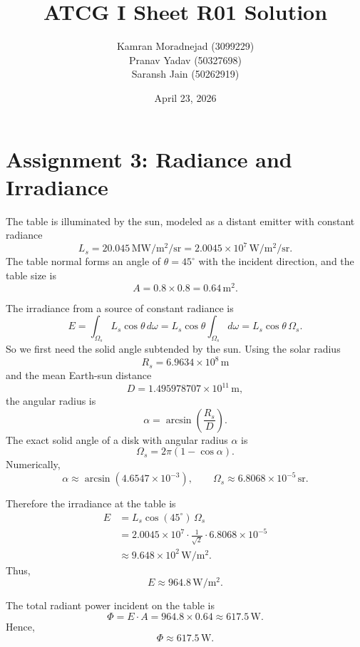 \documentclass[a4paper,11pt]{article}
\title{ATCG I Sheet R01 Solution}
\author{
\large Kamran Moradnejad (3099229) \\
\large Pranav Yadav (50327698) \\
\large Saransh Jain (50262919)
}
\date{April 23, 2026}
\begin{document}
\maketitle

\section*{Assignment 3: Radiance and Irradiance}
The table is illuminated by the sun, modeled as a distant emitter with constant radiance
\[
L_s = 20.045\,\si{\mega\watt\per\square\meter\per\steradian}
= 2.0045 \times 10^7\,\si{\watt\per\square\meter\per\steradian}.
\]
The table normal forms an angle of $\theta = 45^\circ$ with the incident direction, and the table size is
\[
A = 0.8 \times 0.8 = 0.64\,\si{\square\meter}.
\]

The irradiance from a source of constant radiance is
\[
E = \int_{\Omega_s} L_s \cos\theta \, d\omega
= L_s \cos\theta \int_{\Omega_s} d\omega
= L_s \cos\theta \, \Omega_s.
\]
So we first need the solid angle subtended by the sun. Using the solar radius
\[
R_s = 6.9634 \times 10^8\,\si{\meter}
\]
and the mean Earth-sun distance
\[
D = 1.495978707 \times 10^{11}\,\si{\meter},
\]
the angular radius is
\[
\alpha = \arcsin\left(\frac{R_s}{D}\right).
\]
The exact solid angle of a disk with angular radius $\alpha$ is
\[
\Omega_s = 2\pi(1-\cos\alpha).
\]
Numerically,
\[
\alpha \approx \arcsin(4.6547 \times 10^{-3}),
\qquad
\Omega_s \approx 6.8068 \times 10^{-5}\,\si{\steradian}.
\]

Therefore the irradiance at the table is
\begin{align*}
E
&= L_s \cos(45^\circ)\,\Omega_s \\
&= 2.0045 \times 10^7 \cdot \frac{1}{\sqrt{2}} \cdot 6.8068 \times 10^{-5} \\
&\approx 9.648 \times 10^2\,\si{\watt\per\square\meter}.
\end{align*}
Thus,
\[
\boxed{E \approx 964.8\,\si{\watt\per\square\meter}}.
\]

The total radiant power incident on the table is
\[
\Phi = E \cdot A = 964.8 \times 0.64 \approx 617.5\,\si{\watt}.
\]
Hence,
\[
\boxed{\Phi \approx 617.5\,\si{\watt}}.
\]
\end{document}
